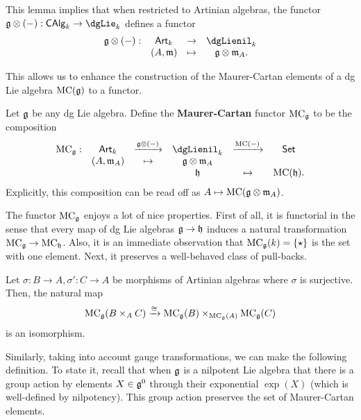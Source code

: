\documentclass[11pt]{amsart}
\begin{document}
This lemma implies that when restricted to Artinian algebras, the functor $\fg \tensor (-) : \CAlg_k \to \dgLie_k$ defines a functor
\[
\begin{array}{cccc}
\fg \tensor (-) : & \Art_k & \to & \dgLienil_k \\
& (A,\fm) & \mapsto & \fg \tensor \fm_A .
\end{array}
\]

This allows us to enhance the construction of the Maurer-Cartan elements of a dg Lie algebra ${\rm MC}(\mathfrak g)$ to a functor.

\begin{dfn}
Let $\mathfrak g$ be any dg Lie algebra.
Define the {\bf Maurer-Cartan} functor ${\rm MC}_\mathfrak g$ to be the composition
\[
\begin{array}{cccccccc}
\MC_\fg: & \Art_k & \xto{\fg \tensor (-)} & \dgLienil_k & \xto{\MC(-)} & \Set \\
& (A,\fm_A) & \mapsto & \fg \tensor \fm_A & & \\
& & & \fh & \mapsto & \MC(\fh) .
\end{array}
\]
Explicitly, this composition can be read off as $A \mapsto {\rm MC}(\mathfrak g \otimes {\mathfrak m}_A)$. 
\end{dfn}

The functor ${\rm MC}_\mathfrak g$ enjoys a lot of nice properties. 
First of all, it is functorial in the sense that every map of dg Lie algebras $\mathfrak g \to \mathfrak h$ induces a natural transformation ${\rm MC}_\mathfrak g \to {\rm MC}_\mathfrak h$. 
Also, it is an immediate observation that ${\rm MC}_\mathfrak g(k) = \{\star\}$ is the set with one element. 
Next, it preserves a well-behaved class of pull-backs. 

\begin{ex}
\label{ex: MC}
Let $\sigma : B \to A, \sigma' : C \to A$ be morphisms of Artinian algebras where $\sigma$ is surjective.
Then, the natural map
\[
{\rm MC}_\mathfrak g(B \times_A C) \xrightarrow{\cong} {\rm MC}_\mathfrak g(B) \times_{{\rm MC}_\mathfrak g(A)} {\rm MC}_\mathfrak g(C)
\]
is an isomorphism.
\end{ex}

Similarly, taking into account gauge transformations, we can make the following definition.
To state it, recall that when $\mathfrak g$ is a nilpotent Lie algebra that there is a group action by elements $X \in \mathfrak g^0$ through their exponential $\exp(X)$ (which is well-defined by nilpotency). 
This group action preserves the set of Maurer-Cartan elements. 
\end{document}
